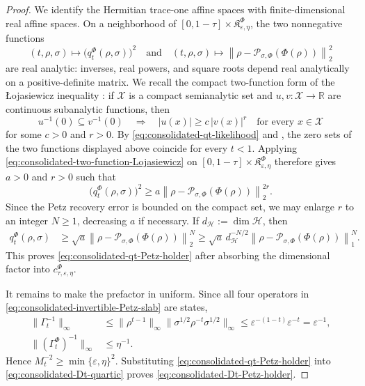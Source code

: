 \documentclass[11pt]{article}
\theoremstyle{remark}
\newcommand{\1}{\mathbbm{1}}
\begin{document}
\begin{proof}
We identify the Hermitian trace-one affine spaces with finite-dimensional
real affine spaces.  On a neighborhood of
$[0,1-\tau]\times\mathfrak K_{\varepsilon,\eta}^{\Phi}$, the two
nonnegative functions
\begin{equation*}
 (t,\rho,\sigma)\longmapsto
 \bigl(q_t^\Phi(\rho,\sigma)\bigr)^2
 \quad\text{and}\quad
 (t,\rho,\sigma)\longmapsto
 \left\lVert\rho-
 \mathcal P_{\sigma,\Phi}(\Phi(\rho))\right\rVert_2^2
\end{equation*}
are real analytic: inverses, real powers, and square roots depend real
analytically on a positive-definite matrix.  We recall the compact
two-function form of the \L{}ojasiewicz inequality
\cite[Theorem~6.4]{bierstone1988semianalytic}: if $\mathcal X$ is a
compact semianalytic set and $u,v:\mathcal X\to\mathbb R$ are
continuous subanalytic functions, then
\begin{equation}
 u^{-1}(0)\subseteq v^{-1}(0)
 \quad\Longrightarrow\quad
 |u(x)|\geq c\,|v(x)|^r
 \quad\text{for every }x\in\mathcal X
 \label{eq:consolidated-two-function-Lojasiewicz}
\end{equation}
for some $c>0$ and $r>0$.  By
\eqref{eq:consolidated-qt-likelihood} and
, the zero sets of
the two functions displayed above coincide for every $t<1$.
Applying \eqref{eq:consolidated-two-function-Lojasiewicz} on
$[0,1-\tau]\times\mathfrak K_{\varepsilon,\eta}^{\Phi}$ therefore
gives $a>0$ and $r>0$ such that
\begin{equation}
 \bigl(q_t^\Phi(\rho,\sigma)\bigr)^2
 \geq a
 \left\lVert\rho-
 \mathcal P_{\sigma,\Phi}(\Phi(\rho))\right\rVert_2^{2r}.
\end{equation}
Since the Petz recovery error is bounded on the compact set, we may
enlarge $r$ to an integer $N\geq1$, decreasing $a$ if necessary.  If
$d_{\mathcal H}:=\dim\mathcal H$, then
\begin{align}
 q_t^\Phi(\rho,\sigma)
 &\geq \sqrt a\left\lVert\rho-
 \mathcal P_{\sigma,\Phi}(\Phi(\rho))\right\rVert_2^N
 \geq \sqrt a\,d_{\mathcal H}^{-N/2}
 \left\lVert\rho-
 \mathcal P_{\sigma,\Phi}(\Phi(\rho))\right\rVert_1^N.
 \label{eq:consolidated-Lojasiewicz-trace-comparison}
\end{align}
This proves \eqref{eq:consolidated-qt-Petz-holder} after absorbing the
dimensional factor into $c_{\tau,\varepsilon,\eta}^{\Phi}$.

It remains to make the prefactor in 
uniform.  Since all four operators in
\eqref{eq:consolidated-invertible-Petz-slab} are states,
\begin{align*}
 \lVert\Gamma_t^{-1}\rVert_\infty
 &\leq
 \lVert\rho^{t-1}\rVert_\infty
 \lVert\sigma^{1/2}\rho^{-t}\sigma^{1/2}\rVert_\infty
 \leq\varepsilon^{-(1-t)}\varepsilon^{-t}
 =\varepsilon^{-1},\\
 \lVert(\Gamma_t^\Phi)^{-1}\rVert_\infty
 &\leq\eta^{-1}.
\end{align*}
Hence $M_t^{-2}\geq\min\{\varepsilon,\eta\}^2$.
Substituting \eqref{eq:consolidated-qt-Petz-holder} into
\eqref{eq:consolidated-Dt-quartic} proves
\eqref{eq:consolidated-Dt-Petz-holder}.
\end{proof}
\end{document}
